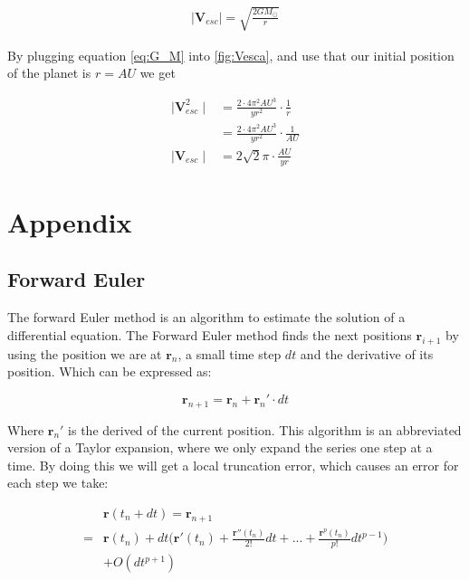\documentclass{article}
\begin{document}
\begin{align}
    \mid{\mathbf{V}_{esc}}\mid=\sqrt{\frac{2GM_{\odot}}{r}}
    \label{fig:Vesca}
\end{align}

By plugging equation \ref{eq:G_M} into \ref{fig:Vesca}, and use that our initial position of the planet is $r=AU$ we get

\begin{align}
\mid{\mathbf{V}_{esc}^2}\mid&=\frac{2\cdot 4\pi^2AU^3}{yr^2}\cdot\frac{1}{r}\\
&=\frac{2\cdot 4\pi^2AU^3}{yr^2}\cdot\frac{1}{AU}\\
\mid{\mathbf{V}_{esc}}\mid&=2\sqrt{2}\pi\cdot\frac{AU}{yr}
\end{align}

\section{Appendix} %
\subsection{Forward Euler}
The forward Euler method is an algorithm to estimate the solution of a differential equation. The Forward Euler method  finds the next positions $\mathbf{r}_{i+1}$ by using the position we are at $\mathbf{r}_{n}$, a small time step $dt$ and the derivative of its position. Which can be expressed as:

\begin{equation}
\mathbf{r}_{n+1}=\mathbf{r}_n + \mathbf{r}_n'\cdot dt
\label{eq:yn1}
\end{equation}

Where $\mathbf{r}_n'$ is the derived of the current position. This algorithm is an abbreviated version of a Taylor expansion, where we only expand the series one step at a time. By doing this we will get a local truncation error, which causes an error for each step we take:

\begin{equation}
\begin{split}
&\mathbf{r}(t_n+dt)=\mathbf{r}_{n+1}\\
=&\mathbf{r}(t_n)+dt\bigg(\mathbf{r}'(t_n) + \frac{\mathbf{r}''(t_n)}{2!}dt + ... + \frac{\mathbf{r}^p(t_n)}{p!}dt^{p-1}\bigg) \\
&+ O(dt^{p+1})
\end{split}
\label{eq:ytndt}
\end{equation} 
\end{document}
